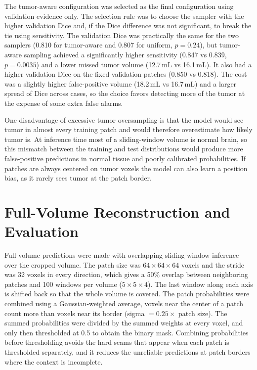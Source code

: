 \documentclass[10pt,a4paper]{article}
\begin{document}
The tumor-aware configuration was selected as the final configuration using validation evidence only. The selection rule was to choose the sampler with the higher validation Dice and, if the Dice difference was not significant, to break the tie using sensitivity. The validation Dice was practically the same for the two samplers (0.810 for tumor-aware and 0.807 for uniform, $p=0.24$), but tumor-aware sampling achieved a significantly higher sensitivity (0.847 vs 0.839, $p=0.0035$) and a lower missed tumor volume (12.7\,mL vs 16.1\,mL). It also had a higher validation Dice on the fixed validation patches (0.850 vs 0.818). The cost was a slightly higher false-positive volume (18.2\,mL vs 16.7\,mL) and a larger spread of Dice across cases, so the choice favors detecting more of the tumor at the expense of some extra false alarms.

One disadvantage of excessive tumor oversampling is that the model would see tumor in almost every training patch and would therefore overestimate how likely tumor is. At inference time most of a sliding-window volume is normal brain, so this mismatch between the training and test distributions would produce more false-positive predictions in normal tissue and poorly calibrated probabilities. If patches are always centered on tumor voxels the model can also learn a position bias, as it rarely sees tumor at the patch border.

\section{Full-Volume Reconstruction and Evaluation}
Full-volume predictions were made with overlapping sliding-window inference over the cropped volume. The patch size was $64\times64\times64$ voxels and the stride was 32 voxels in every direction, which gives a 50\% overlap between neighboring patches and 100 windows per volume ($5\times5\times4$). The last window along each axis is shifted back so that the whole volume is covered. The patch probabilities were combined using a Gaussian-weighted average, voxels near the center of a patch count more than voxels near its border (sigma $=0.25\times$ patch size). The summed probabilities were divided by the summed weights at every voxel, and only then thresholded at 0.5 to obtain the binary mask. Combining probabilities before thresholding avoids the hard seams that appear when each patch is thresholded separately, and it reduces the unreliable predictions at patch borders where the context is incomplete.
\end{document}
